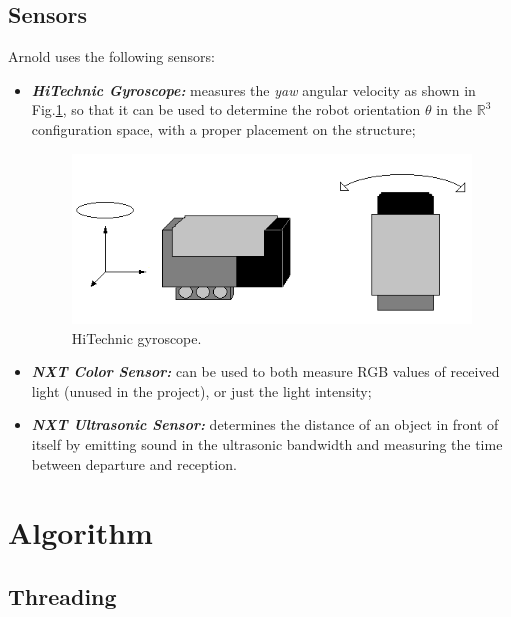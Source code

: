 \documentclass[a4paper,11pt,oneside]{book}
\begin{document}
			
			\subsection {Sensors}
			
			Arnold uses the following sensors:
			\begin{itemize}
				\item \textit{ \textbf {HiTechnic Gyroscope:}} measures the \textit{yaw} angular velocity as shown in Fig.\ref{fig:gyroscope.png}, so that it can be used to determine the robot orientation $\theta$ in the $\mathbb{R}^3$ configuration space, with a proper placement on the structure;
				\begin{figure}[H]
					\centering
					\includegraphics[scale=0.6]{figs/gyroscope}
					\caption{HiTechnic gyroscope.}\label{fig:gyroscope.png}
				\end{figure}
			
				\item \textit{\textbf {NXT Color Sensor:}} can be used to both measure RGB values of received light (unused in the project), or just the light intensity;
				
				\item \textit{\textbf {NXT Ultrasonic Sensor:}} determines the distance of an object in front of itself by emitting sound in the ultrasonic bandwidth and measuring the time between departure and reception.
				
			\end{itemize}
			
			
			
			\section{Algorithm}
			\subsection {Threading}
			
\end{document}
